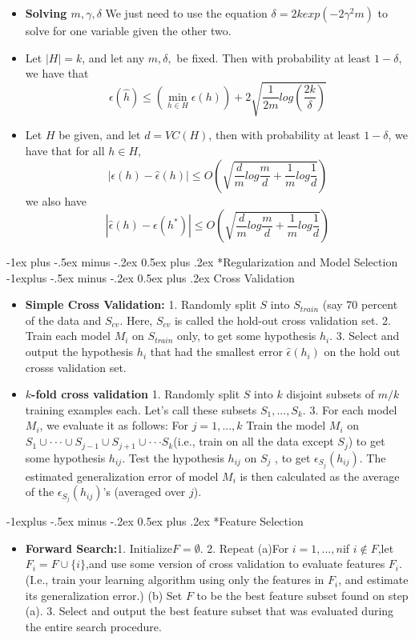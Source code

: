 \documentclass[10pt,landscape]{article}
\makeatletter
\renewcommand{\section}{\@startsection{section}{1}{0mm}%
                                {-1ex plus -.5ex minus -.2ex}%
                                {0.5ex plus .2ex}%
                                {\normalfont\large\bfseries}}
\renewcommand{\subsection}{\@startsection{subsection}{2}{0mm}%
                                {-1explus -.5ex minus -.2ex}%
                                {0.5ex plus .2ex}%
                                {\normalfont\normalsize\bfseries}}
\makeatother
\begin{document}
\begin{multicols}{3}
\begin{itemize}
\item \textbf{Solving $m, \gamma, \delta$} We just need to use the equation $\delta = 2k exp(-2\gamma^2m)$ to solve for one variable given the other two. 
\item  Let $|H| = k$, and let any $m, \delta,$ be fixed. Then with probability at least $ 1-\delta$, we have that 
$$
\epsilon(\hat{h})  \leq (\min_{h \in H} \epsilon(h)) + 2\sqrt{\frac{1}{2m} log(\frac{2k}{\delta})}
$$
\item Let $H$ be given, and let $d = VC(H)$, then with probability at least $1-\delta$, we have that for all $h \in H$, \\
$$
|\epsilon(h) - \hat{\epsilon}(h)| \leq O(\sqrt{\frac{d}{m}log\frac{m}{d}+ \frac{1}{m}log\frac{1}{d}})
$$
we also have 
$$
|\hat{\epsilon}(h) - \epsilon(h^*)| \leq O(\sqrt{\frac{d}{m}log\frac{m}{d}+ \frac{1}{m}log\frac{1}{d}})
$$
\end{itemize}
\section*{Regularization and Model Selection}
\subsection{Cross Validation}
\begin{itemize}
\item \textbf{Simple Cross Validation:} 1. Randomly split $S$ into $S_{train}$ (say 70 percent of the data and $S_{cv}$. Here, $S_{cv}$ is called the hold-out cross validation set. 2. Train each model $M_i$ on $S_{train}$ only, to get some hypothesis $h_i$. 3. Select and output the hypothesis $h_i$ that had the smallest error $\hat{\epsilon}(h_i)$ on the hold out crosss validation set. 
\item \textbf{$k$-fold cross validation}  1. Randomly split $S$ into $ k$ disjoint subsets of $m/k$ training examples each. Let’s call these subsets $S_1, . . . , S_k$. 3. For each model $M_i$, we evaluate it as follows: For $j = 1, . . . , k$
Train the model $M_i$ on $S_1 \cup··· \cup S_{j−1} \cup S_{j+1} \cup···S_k $(i.e., train on all the data except $S_j$) to get some hypothesis $h_{ij}$.
Test the hypothesis $h_{ij}$ on $S_j$ , to get $\epsilon_{S_j} (h_{ij} )$.
The estimated generalization error of model $M_i$ is then calculated
as the average of the $\epsilon_{S_j} (h_{ij})$’s (averaged over $j$).
\end{itemize}
\subsection*{Feature Selection}
\begin{itemize}
\item \textbf{Forward Search:}1. Initialize$ F = \emptyset$.
2. Repeat 
(a)For $i=1,...,n$if $i  \notin F$,let $F_i =F \cup\{ i\}$,and use some version of cross validation to evaluate features $F_i$. (I.e., train your learning algorithm using only the features in $F_i$, and estimate its generalization error.)
(b) Set $F$ to be the best feature subset found on step (a).
3. Select and output the best feature subset that was evaluated during the entire search procedure.
\end{itemize}

\end{multicols}
\end{document}
